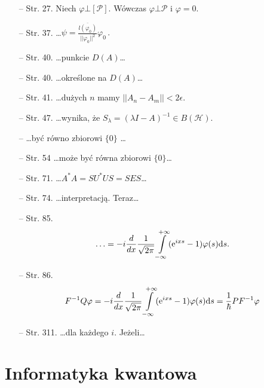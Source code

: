 \documentclass[a4paper,11pt]{article}
\begin{document}
\begin{itemize}
\item[--] Str. 27. Niech $\varphi \bot [ \mathcal{ P } ]$.  Wówczas
  $\varphi \bot \mathcal{ P }$ i $\varphi = 0$.
\item[--] Str. 37.
  \ldots$\psi = \frac{ \overline{ l ( \varphi_{ 0 } ) } }{ ||
    \varphi_{ 0 } ||^{ 2 } } \varphi_{ 0 } \, .$
\item[--] Str. 40. \ldots punkcie $D( A )$\ldots
\item[--] Str. 40. \ldots określone na $D( A )$\ldots
\item[--] Str. 41. \ldots dużych $n$ mamy
  $|| A_{ n } - A_{ m } || < 2 \epsilon$.
\item[--] Str. 47. \ldots wynika, że
  $S_{ \lambda } = ( \lambda I - A )^{ -1 } \in B( \mathcal{ H } )$.
\item[--] \ldots być równo zbiorowi $\{ 0 \}$ \ldots
\item[--] Str. 54 \ldots może być równa zbiorowi $\{ 0 \}$\ldots
\item[--] Str. 71. \ldots$A^{ * } A = S U^{ * } U S = S E S$\ldots
\item[--] Str. 74. \ldots interpretacją. Teraz\ldots
\item[--] Str. 85.
  $$\ldots = -i \frac{ d }{ dx } \frac{ 1 }{ \sqrt{ 2 \pi } }
  \int\limits_{ -\infty }^{ +\infty } ( \mathrm{e}^{ i x s } - 1 ) \varphi(
  s ) \mathrm{d} s \textrm{.}$$
\item[--] Str. 86.
  $$F^{ -1 } Q \varphi = -i \frac{ d }{ dx } \frac{ 1 }{ \sqrt{ 2 \pi }
  } \int\limits_{ -\infty }^{ +\infty } ( \mathrm{e}^{ i x s } - 1 )
  \varphi( s ) \mathrm{d} s = \frac{ 1 }{ \hbar } P F^{ -1 } \varphi$$
\item[--] Str. 311. \ldots dla każdego $i$. Jeżeli\ldots
\end{itemize}










\newpage
\section{Informatyka kwantowa}

\vspace{\spaceTwo}



\end{document}
